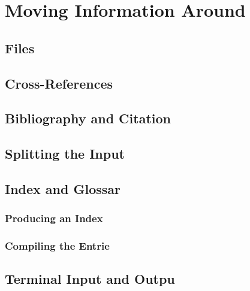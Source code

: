 \section{Moving Information Around}
\subsection{Files}


\subsection{Cross-References}


\subsection{Bibliography and Citation}


\subsection{Splitting the Input}


\subsection{Index and Glossar}
\subsubsection{Producing an Index}
\subsubsection{Compiling the Entrie}


\subsection{Terminal Input and Outpu}
\newpage